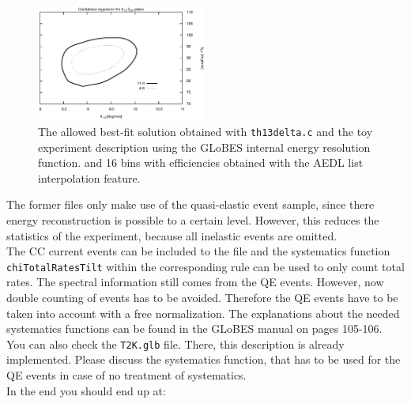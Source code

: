 \documentclass[12pt,a4paper]{article}
\newcommand{\aufg}[2]{\vspace{4mm}{\bf\underline{Problem #1:} {#2}} \vspace{3mm}}
\theoremstyle{dotless}
\begin{document}
\begin{figure}[h!]
  \begin{center}
    \includegraphics[width=0.5\textwidth]{Bins.eps}   
      \end{center}
  \vspace{-0.7 cm}
  \caption{\small The allowed best-fit solution obtained with {\tt th13delta.c}
  and the toy experiment description using the GLoBES internal energy resolution function.
  and 16 bins with efficiencies obtained with the AEDL list interpolation feature.}
  \label{fig:Bins}
\end{figure}


\aufg{6}{Usage of Total Rates}

The former files only make use of the quasi-elastic event sample, since there energy
reconstruction is possible to a certain level. However, this reduces the statistics of the
experiment, because all inelastic events are omitted.\\

The CC current events can be included to the file and the systematics function
{\tt chiTotalRatesTilt} within the corresponding rule can be used to only count 
total rates. The spectral information still comes from the QE events. However, now double
counting of events has to be avoided. Therefore the QE events have to be taken into account
with a free normalization. The explanations about the needed systematics functions can be found
in the GLoBES manual on pages 105-106. You can also check the {\tt T2K.glb} file. There, this
description is already implemented. Please discuss the systematics function, that has to be
used for the QE events in case of no treatment of systematics.\\

In the end you should end up at:\\
\end{document}
